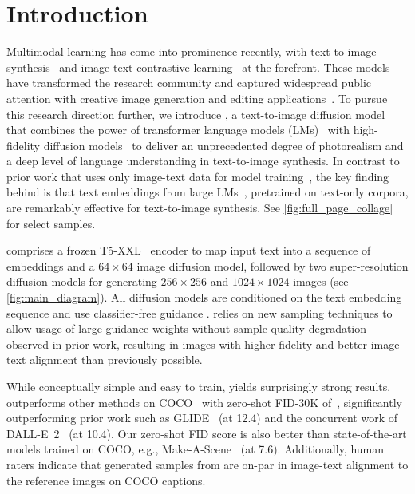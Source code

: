 

\vspace{\presectionspace}
\section{Introduction}
\vspace{\postsectionspace}
Multimodal learning has come into prominence recently, with text-to-image synthesis~\cite{ramesh-dalle, crowson2022vqgan, rombach-cvpr-2022} and image-text contrastive learning~\cite{radford-icml-2021,jia2021scaling,weston2011wsabie} at the forefront.
These models have transformed the research community and captured widespread public attention with creative image generation \cite{gafni2022make, ramesh-dalle2} and editing applications~\cite{fu2021language, nichol-glide, kim2021diffusionclip}.
To pursue this research direction further, we introduce \name, a text-to-image diffusion model that combines the power of transformer language models (LMs)~\cite{devlin-naacl-2019,raffel-jmlr-2020} with high-fidelity diffusion models~\cite{ho2020denoising, ho2021cascaded, dhariwal2021diffusion, nichol-glide} to deliver an unprecedented degree of photorealism and a deep level of language understanding in text-to-image synthesis.
In contrast to prior work that uses only image-text data for model training~\cite[e.g.,][]{ramesh-dalle, nichol-glide}, the key finding behind \name is that text embeddings from large LMs~\cite{raffel-jmlr-2020, devlin-naacl-2019},
pretrained on text-only corpora, are remarkably effective for text-to-image synthesis.
See \cref{fig:full_page_collage} for select samples.



\name comprises a frozen T5-XXL~\cite{raffel-jmlr-2020} encoder to map input text into a sequence of embeddings and a $64\!\times\!64$ image diffusion model, followed by two super-resolution diffusion models for generating $256\!\times\!256$ and $1024\!\times\!1024$ images (see \cref{fig:main_diagram}). All diffusion models are conditioned on the text embedding sequence and use classifier-free guidance \cite{ho2021classifierfree}. \name relies on new sampling techniques to allow usage of large guidance weights without sample quality degradation observed in prior work, resulting in images with higher fidelity and better image-text alignment than previously possible. 

While conceptually simple and easy to train, \name yields surprisingly strong results.  \name outperforms other methods on COCO~\cite{lin-eccv-2014} with zero-shot FID-30K of~\ourmscocofid, significantly outperforming prior work such as GLIDE~\cite{nichol-glide} (at 12.4) and the concurrent work of DALL-E~2~\cite{ramesh-dalle2} (at 10.4). Our zero-shot FID score is also better than state-of-the-art models trained on COCO, e.g., Make-A-Scene~\cite{gafni2022make} (at 7.6). 
Additionally, human raters indicate that generated samples from \name are on-par in image-text alignment to the reference images on COCO captions.


